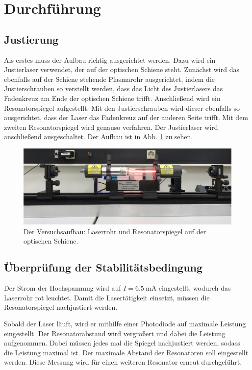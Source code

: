\section{Durchführung}
\label{sec:Durchführung}

\subsection{Justierung}
Als erstes muss der Aufbau richtig ausgerichtet werden. Dazu wird ein Justierlaser verwendet, der auf der optischen Schiene steht. Zunächst wird das ebenfalls auf der Schiene stehende Plasmarohr ausgerichtet, indem die Justierschrauben so verstellt werden, dass das Licht des Justierlasers das Fadenkreuz am Ende der optischen Schiene trifft.
Anschließend wird ein Resonatorspiegel aufgestellt. Mit den Justierschrauben wird dieser ebenfalls so ausgerichtet, dass der Laser das Fadenkreuz auf der anderen Seite trifft. Mit dem zweiten Resonatorspiegel wird genauso verfahren. Der Justierlaser wird anschließend ausgeschaltet. Der Aufbau ist in Abb. \ref{fig:aufbau} zu sehen.

\begin{figure}
    \centering
    \includegraphics[width=12cm]{fotos/Aufbau2.JPG}
    \caption{Der Versuchsaufbau: Laserrohr und Resonatorspiegel auf der optischen Schiene.}
    \label{fig:aufbau}
\end{figure}    


\subsection{Überprüfung der Stabilitätsbedingung}
Der Strom der Hochspannung wird auf $I = \SI{6.5}{\milli\ampere}$ eingestellt, wodurch das Laserrohr rot leuchtet. Damit die Lasertätigkeit einsetzt, müssen die Resonatorspiegel nachjustiert werden.

Sobald der Laser läuft, wird er mithilfe einer Photodiode auf maximale Leistung eingestellt.
Der Resonatorabstand wird vergrößert und dabei die Leistung aufgenommen. Dabei müssen jedes mal die Spiegel nachjustiert werden, sodass die Leistung maximal ist. 
Der maximale Abstand der Resonatoren soll eingestellt werden.
Diese Messung wird für einen weiteren Resonator erneut durchgeführt.


